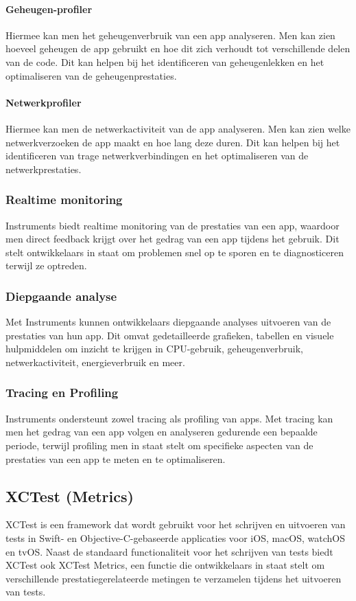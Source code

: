 \paragraph{Geheugen-profiler}
Hiermee kan men het geheugenverbruik van een app analyseren. Men kan zien hoeveel geheugen de app gebruikt en hoe dit zich verhoudt tot verschillende delen van de code. Dit kan helpen bij het identificeren van geheugenlekken en het optimaliseren van de geheugenprestaties.
\paragraph{Netwerkprofiler}
Hiermee kan men de netwerkactiviteit van de app analyseren. Men kan zien welke netwerkverzoeken de app maakt en hoe lang deze duren. Dit kan helpen bij het identificeren van trage netwerkverbindingen en het optimaliseren van de netwerkprestaties.

\subsubsection{Realtime monitoring}
Instruments biedt realtime monitoring van de prestaties van een app, waardoor men direct feedback krijgt over het gedrag van een app tijdens het gebruik. Dit stelt ontwikkelaars in staat om problemen snel op te sporen en te diagnosticeren terwijl ze optreden.
\subsubsection{Diepgaande analyse}
Met Instruments kunnen ontwikkelaars diepgaande analyses uitvoeren van de prestaties van hun app. Dit omvat gedetailleerde grafieken, tabellen en visuele hulpmiddelen om inzicht te krijgen in CPU-gebruik, geheugenverbruik, netwerkactiviteit, energieverbruik en meer.
\subsubsection{Tracing en Profiling}
Instruments ondersteunt zowel tracing als profiling van apps. Met tracing kan men het gedrag van een app volgen en analyseren gedurende een bepaalde periode, terwijl profiling men in staat stelt om specifieke aspecten van de prestaties van een app te meten en te optimaliseren.

\subsection{XCTest (Metrics)}
XCTest is een framework dat wordt gebruikt voor het schrijven en uitvoeren van tests in Swift- en Objective-C-gebaseerde applicaties voor iOS, macOS, watchOS en tvOS. Naast de standaard functionaliteit voor het schrijven van tests biedt XCTest ook XCTest Metrics, een functie die ontwikkelaars in staat stelt om verschillende prestatiegerelateerde metingen te verzamelen tijdens het uitvoeren van tests.

